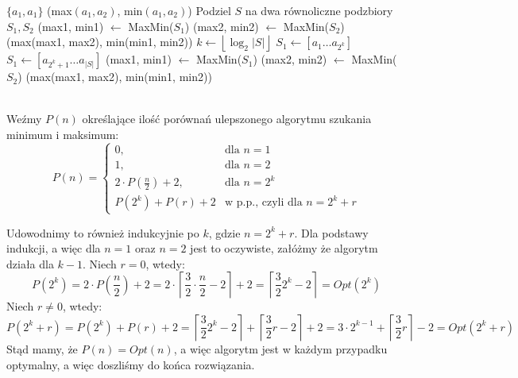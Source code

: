 \documentclass[a4paper,12pt]{article}
\newcommand{\floor}[1]{\left\lfloor #1 \right\rfloor}
\newcommand{\ceil}[1]{\left\lceil #1 \right\rceil}
\begin{document}
\begin{algorithmic}
	\State \Return $\{ a_1, a_1 \}$ 
	\State \Return (max$(a_1, a_2)$, min$(a_1, a_2)$)
	\State Podziel $S$ na dwa równoliczne podzbiory $S_1, S_2$
	\State (max1, min1) $\gets$ MaxMin($S_1$)
	\State (max2, min2) $\gets$ MaxMin($S_2$)
	\State \Return (max(max1, max2), min(min1, min2))
\Else 
	\State $k \gets \floor{\log_{2}\vert S \vert}$
	\State $S_1 \gets [a_1 \dots a_{2^k}]$
	\State  $S_1 \gets [a_{2^k+1} \dots a_{\vert S \vert}]$
	\State (max1, min1) $\gets$ MaxMin($S_1$)
	\State (max2, min2) $\gets$ MaxMin($S_2$)
	\State \Return (max(max1, max2), min(min1, min2))
\EndIf
\EndFunction
\end{algorithmic} 

~\\ \noindent Weźmy $P(n)$ określające ilość porównań ulepszonego algorytmu szukania minimum i maksimum:
$$
P(n) = 
\begin{cases}
0, 					& \text{dla } n=1\\
1, 					& \text{dla } n=2\\
2\cdot P(\frac{n}{2}) + 2, 	& \text{dla } n = 2^k\\
P(2^k)+P(r)+2			& \text{w p.p., czyli dla } n = 2^k + r 
\end{cases}
$$

\noindent Udowodnimy to również indukcyjnie po $k$, gdzie $n = 2^k + r$. Dla podstawy indukcji, a więc dla $n =1$ oraz $n=2$ jest to oczywiste, załóżmy że algorytm działa dla $k-1$.
\newline Niech $r=0$, wtedy:
$$ P(2^k) = 2\cdot P(\frac{n}{2}) + 2 = 2 \cdot \ceil{\frac{3}{2}\cdot\frac{n}{2}-2} + 2  = \ceil{\frac{3}{2}2^k-2} = Opt(2^k)$$
\noindent Niech $r \neq 0$, wtedy:
$$ P(2^k+r) = P(2^k) + P(r) + 2 = \ceil{\frac{3}{2}2^k-2} + \ceil{\frac{3}{2}r-2} + 2 = 3\cdot 2^{k-1} + \ceil{\frac{3}{2}r} - 2 = Opt(2^k+r)$$
\noindent Stąd mamy, że $P(n) = Opt(n)$, a więc algorytm jest w każdym przypadku optymalny, a więc doszliśmy do końca rozwiązania.
\end{document}
